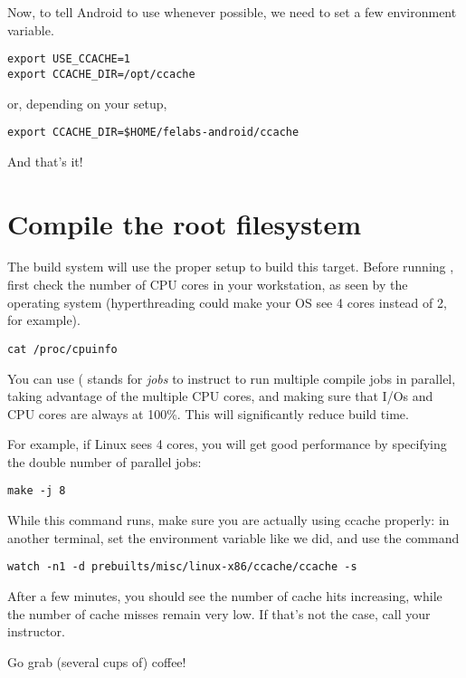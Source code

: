 Now, to tell Android to use  whenever possible, we need
to set a few environment variable.

\begin{verbatim}
export USE_CCACHE=1
export CCACHE_DIR=/opt/ccache
\end{verbatim}
or, depending on your setup,
\begin{verbatim}
export CCACHE_DIR=$HOME/felabs-android/ccache
\end{verbatim}

And that's it!

\section{Compile the root filesystem}

The build system will use the proper setup to build this
target. Before running , first check the number of CPU
cores in your workstation, as seen by the operating system
(hyperthreading could make your OS see 4 cores instead of 2, for
example).

\begin{verbatim}
cat /proc/cpuinfo
\end{verbatim}

You can use  ( stands for {\it jobs} to instruct
 to run multiple compile jobs in parallel, taking advantage
of the multiple CPU cores, and making sure that I/Os and CPU cores are
always at 100\%. This will significantly reduce build time.

For example, if Linux sees 4 cores, you will get good performance by
specifying the double number of parallel jobs:

\begin{verbatim}
make -j 8
\end{verbatim}

While this command runs, make sure you are actually using ccache
properly: in another terminal, set the  environment
variable like we did, and use the command

\begin{verbatim}
watch -n1 -d prebuilts/misc/linux-x86/ccache/ccache -s
\end{verbatim}

After a few minutes, you should see the number of cache hits
increasing, while the number of cache misses remain very low. If
that's not the case, call your instructor.

Go grab (several cups of) coffee!

